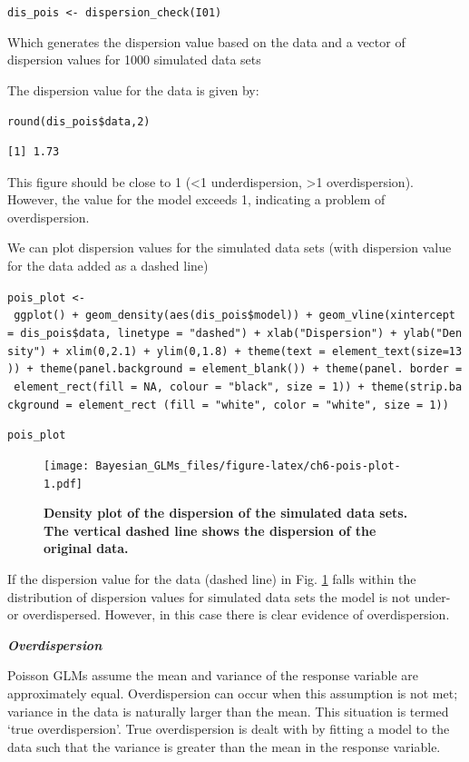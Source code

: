 \documentclass[
]{book}
\begin{document}
\texttt{dis\_pois\ \textless{}-\ dispersion\_check(I01)}

Which generates the dispersion value based on the data and a vector of dispersion values for 1000 simulated data sets

The dispersion value for the data is given by:

\texttt{round(dis\_pois\$data,2)}

\begin{verbatim}
[1] 1.73
\end{verbatim}

This figure should be close to 1 (\textless1 underdispersion, \textgreater1 overdispersion). However, the value for the model exceeds 1, indicating a problem of overdispersion.

We can plot dispersion values for the simulated data sets (with dispersion value for the data added as a dashed line)

\texttt{pois\_plot\ \textless{}-\ ggplot()\ +\ geom\_density(aes(dis\_pois\$model))\ +\ geom\_vline(xintercept\ =\ dis\_pois\$data,\ linetype\ =\ "dashed")\ +\ xlab("Dispersion")\ +\ ylab("Density")\ +\ xlim(0,2.1)\ +\ ylim(0,1.8)\ +\ theme(text\ =\ element\_text(size=13))\ +\ theme(panel.background\ =\ element\_blank())\ +\ theme(panel.\ border\ =\ element\_rect(fill\ =\ NA,\ colour\ =\ "black",\ size\ =\ 1))\ +\ theme(strip.background\ =\ element\_rect\ (fill\ =\ "white",\ color\ =\ "white",\ size\ =\ 1))}

\texttt{pois\_plot}



\begin{figure}
\centering
\texttt{[image: Bayesian\_GLMs\_files/figure-latex/ch6-pois-plot-1.pdf]}
\caption{\label{fig:ch6-pois-plot}\textbf{Density plot of the dispersion of the simulated data sets. The vertical dashed line shows the dispersion of the original data.}}
\end{figure}

If the dispersion value for the data (dashed line) in Fig. \ref{fig:ch6-pois-plot} falls within the distribution of dispersion values for simulated data sets the model is not under- or overdispersed. However, in this case there is clear evidence of overdispersion.

\emph{\textbf{Overdispersion}}

Poisson GLMs assume the mean and variance of the response variable are approximately equal. Overdispersion can occur when this assumption is not met; variance in the data is naturally larger than the mean. This situation is termed `true overdispersion'. True overdispersion is dealt with by fitting a model to the data such that the variance is greater than the mean in the response variable.
\end{document}
